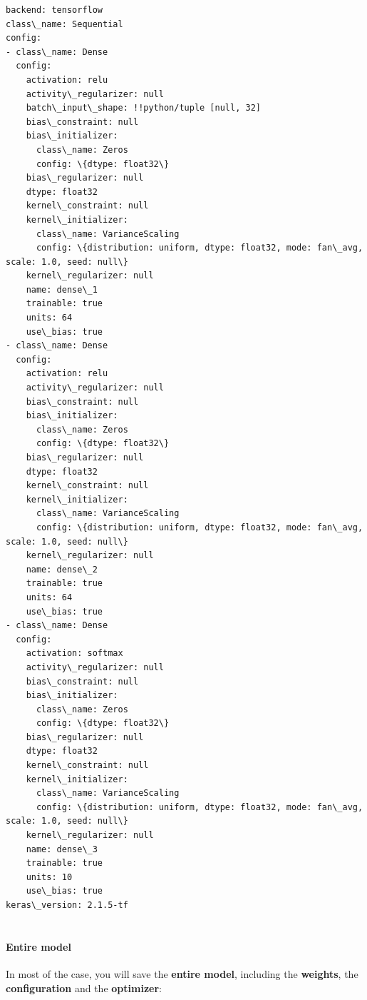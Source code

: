 \documentclass[11pt]{article}
\begin{document}
    \begin{Verbatim}[commandchars=\\\{\}]
backend: tensorflow
class\_name: Sequential
config:
- class\_name: Dense
  config:
    activation: relu
    activity\_regularizer: null
    batch\_input\_shape: !!python/tuple [null, 32]
    bias\_constraint: null
    bias\_initializer:
      class\_name: Zeros
      config: \{dtype: float32\}
    bias\_regularizer: null
    dtype: float32
    kernel\_constraint: null
    kernel\_initializer:
      class\_name: VarianceScaling
      config: \{distribution: uniform, dtype: float32, mode: fan\_avg, scale: 1.0, seed: null\}
    kernel\_regularizer: null
    name: dense\_1
    trainable: true
    units: 64
    use\_bias: true
- class\_name: Dense
  config:
    activation: relu
    activity\_regularizer: null
    bias\_constraint: null
    bias\_initializer:
      class\_name: Zeros
      config: \{dtype: float32\}
    bias\_regularizer: null
    dtype: float32
    kernel\_constraint: null
    kernel\_initializer:
      class\_name: VarianceScaling
      config: \{distribution: uniform, dtype: float32, mode: fan\_avg, scale: 1.0, seed: null\}
    kernel\_regularizer: null
    name: dense\_2
    trainable: true
    units: 64
    use\_bias: true
- class\_name: Dense
  config:
    activation: softmax
    activity\_regularizer: null
    bias\_constraint: null
    bias\_initializer:
      class\_name: Zeros
      config: \{dtype: float32\}
    bias\_regularizer: null
    dtype: float32
    kernel\_constraint: null
    kernel\_initializer:
      class\_name: VarianceScaling
      config: \{distribution: uniform, dtype: float32, mode: fan\_avg, scale: 1.0, seed: null\}
    kernel\_regularizer: null
    name: dense\_3
    trainable: true
    units: 10
    use\_bias: true
keras\_version: 2.1.5-tf


    \end{Verbatim}

    \hypertarget{entire-model}{%
\paragraph{Entire model}\label{entire-model}}

    In most of the case, you will save the \textbf{entire model}, including
the \textbf{weights}, the \textbf{configuration} and the
\textbf{optimizer}:
\end{document}
